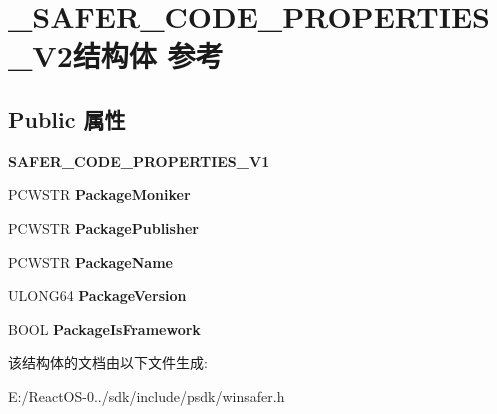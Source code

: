 \hypertarget{struct___s_a_f_e_r___c_o_d_e___p_r_o_p_e_r_t_i_e_s___v2}{}\section{\+\_\+\+S\+A\+F\+E\+R\+\_\+\+C\+O\+D\+E\+\_\+\+P\+R\+O\+P\+E\+R\+T\+I\+E\+S\+\_\+\+V2结构体 参考}
\label{struct___s_a_f_e_r___c_o_d_e___p_r_o_p_e_r_t_i_e_s___v2}
\subsection*{Public 属性}
\begin{DoxyCompactItemize}
\item 
\mbox{\label{struct___s_a_f_e_r___c_o_d_e___p_r_o_p_e_r_t_i_e_s___v2_acda2386a5c18fd067cf7b4b32ee2e061}} 
{\bfseries S\+A\+F\+E\+R\+\_\+\+C\+O\+D\+E\+\_\+\+P\+R\+O\+P\+E\+R\+T\+I\+E\+S\+\_\+\+V1}
\item 
\mbox{\label{struct___s_a_f_e_r___c_o_d_e___p_r_o_p_e_r_t_i_e_s___v2_a134a935718bd994f34059a6b52e6a856}} 
P\+C\+W\+S\+TR {\bfseries Package\+Moniker}
\item 
\mbox{\label{struct___s_a_f_e_r___c_o_d_e___p_r_o_p_e_r_t_i_e_s___v2_a8dd0c184acc15b8d8035cf63ed5542c3}} 
P\+C\+W\+S\+TR {\bfseries Package\+Publisher}
\item 
\mbox{\label{struct___s_a_f_e_r___c_o_d_e___p_r_o_p_e_r_t_i_e_s___v2_acfcd04fd8d3847ac59d8ea79c5a32700}} 
P\+C\+W\+S\+TR {\bfseries Package\+Name}
\item 
\mbox{\label{struct___s_a_f_e_r___c_o_d_e___p_r_o_p_e_r_t_i_e_s___v2_a5083a890e6c8de805d2957aab104a1fc}} 
U\+L\+O\+N\+G64 {\bfseries Package\+Version}
\item 
\mbox{\label{struct___s_a_f_e_r___c_o_d_e___p_r_o_p_e_r_t_i_e_s___v2_ad3ff58f66a10c8cb19e7f8901b43503a}} 
B\+O\+OL {\bfseries Package\+Is\+Framework}
\end{DoxyCompactItemize}


该结构体的文档由以下文件生成\+:\begin{DoxyCompactItemize}
\item 
E\+:/\+React\+O\+S-\/0../sdk/include/psdk/winsafer.\+h\end{DoxyCompactItemize}
